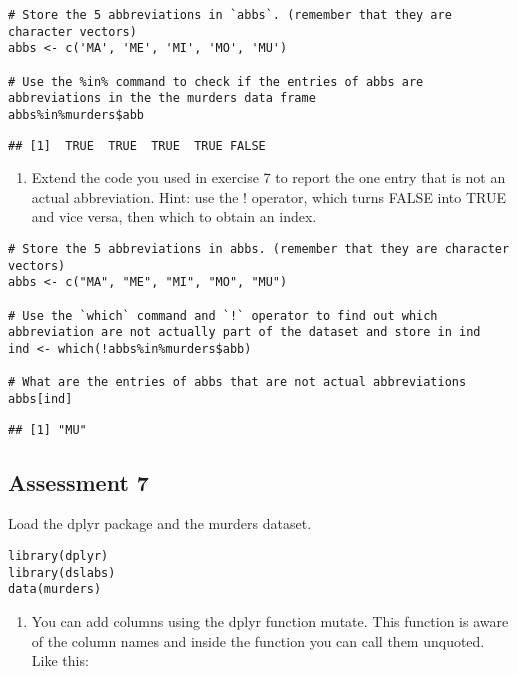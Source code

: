 \documentclass[
]{article}
\providecommand{\tightlist}{%
  \setlength{\itemsep}{0pt}\setlength{\parskip}{0pt}}
\begin{document}
\begin{verbatim}
# Store the 5 abbreviations in `abbs`. (remember that they are character vectors)
abbs <- c('MA', 'ME', 'MI', 'MO', 'MU')

# Use the %in% command to check if the entries of abbs are abbreviations in the the murders data frame
abbs%in%murders$abb
\end{verbatim}

\begin{verbatim}
## [1]  TRUE  TRUE  TRUE  TRUE FALSE
\end{verbatim}

\begin{enumerate}
\def\labelenumi{\arabic{enumi}.}
\setcounter{enumi}{7}
\tightlist
\item
  Extend the code you used in exercise 7 to report the one entry that is
  not an actual abbreviation. Hint: use the ! operator, which turns
  FALSE into TRUE and vice versa, then which to obtain an index.
\end{enumerate}

\begin{verbatim}
# Store the 5 abbreviations in abbs. (remember that they are character vectors)
abbs <- c("MA", "ME", "MI", "MO", "MU") 

# Use the `which` command and `!` operator to find out which abbreviation are not actually part of the dataset and store in ind
ind <- which(!abbs%in%murders$abb)

# What are the entries of abbs that are not actual abbreviations
abbs[ind]
\end{verbatim}

\begin{verbatim}
## [1] "MU"
\end{verbatim}

\hypertarget{assessment-7}{%
\subsection{Assessment 7}\label{assessment-7}}

Load the dplyr package and the murders dataset.

\begin{verbatim}
library(dplyr)
library(dslabs)
data(murders)
\end{verbatim}

\begin{enumerate}
\def\labelenumi{\arabic{enumi}.}
\tightlist
\item
  You can add columns using the dplyr function mutate. This function is
  aware of the column names and inside the function you can call them
  unquoted. Like this:
\end{enumerate}
\end{document}
